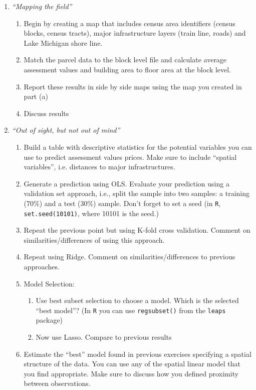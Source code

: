 \documentclass[12pt]{article}
\begin{document}
\begin{enumerate}
  \item {\it ``Mapping the field''}
  \begin{enumerate}
  \item Begin by creating a map that includes census area identifiers (census blocks, census tracts),  major infrastructure layers (train line, roads) and Lake Michigan shore line.
  \item Match the parcel data to the block level file and calculate average assessment values  and building area to floor area at the  block level.
  \item Report these results in side by side maps using the map you created in part (a)
  \item Discuss results
  \end{enumerate}
  \item {\it ``Out of sight, but not out of mind''}
  \begin{enumerate}
    
    \item Build a table with descriptive statistics for the potential variables you can use to predict assessment values prices. Make sure to include ``spatial variables'', i.e. distances to major infrastructures. 
  	\item Generate a prediction using OLS. Evaluate your prediction using a validation set approach, i.e., split the sample into two samples: a training (70\%) and a test (30\%) sample. Don't forget to set a seed (in \texttt{R}, \texttt{set.seed(10101)}, where 10101 is the seed.)  
    \item Repeat the previous point but using K-fold cross validation. Comment on similarities/differences of using this approach.
    \item Repeat using Ridge. Comment on similarities/differences to previous approaches.
    \item Model Selection:
    \begin{enumerate}
      \item Use best subset selection to choose a model. Which is the selected ``best model''? (In \texttt{R} you can use \texttt{regsubset()} from the \texttt{leaps} package)
      \item Now use Lasso. Compare to previous results
    \end{enumerate}  
    \item Estimate the ``best'' model found in previous exercises specifying a spatial structure of the data. You can use any of the spatial linear model that you find appropriate. Make sure to discuss how you defined proximity between observations.




\end{enumerate}
\end{enumerate}
\end{document}
